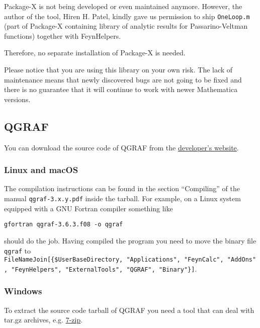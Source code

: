 \documentclass[../FeynHelpersManual.tex]{subfiles}
\begin{document}
Package-X is not being developed or even maintained anymore. However,
the author of the tool, Hiren H. Patel, kindly gave us permission to
ship \texttt{OneLoop.m} (part of Package-X containing library of
analytic results for Passarino-Veltman functions) together with
FeynHelpers.

Therefore, no separate installation of Package-X is needed.

Please notice that you are using this library on your own risk. The lack
of maintenance means that newly discovered bugs are not going to be
fixed and there is no guarantee that it will continue to work with newer
Mathematica versions.

\hypertarget{qgraf}{%
\subsection{QGRAF}\label{qgraf}}

You can download the source code of QGRAF from the
\href{http://cfif.ist.utl.pt/~paulo/qgraf.html}{developer's website}.

\hypertarget{linux-and-macos}{%
\subsubsection{Linux and macOS}\label{linux-and-macos}}

The compilation instructions can be found in the section ``Compiling''
of the manual \texttt{qgraf-3.x.y.pdf} inside the tarball. For example,
on a Linux system equipped with a GNU Fortran compiler something like

\begin{verbatim}
gfortran qgraf-3.6.3.f08 -o qgraf
\end{verbatim}

should do the job. Having compiled the program you need to move the
binary file \texttt{qgraf} to
\texttt{FileNameJoin[\allowbreak{}\{\allowbreak{}\$UserBaseDirectory,\ \allowbreak{}"Applications",\ \allowbreak{}"FeynCalc",\ \allowbreak{}"AddOns",\ \allowbreak{}"FeynHelpers",\ \allowbreak{}"ExternalTools",\ \allowbreak{}"QGRAF",\ \allowbreak{}"Binary"\}]}.

\hypertarget{windows-4}{%
\subsubsection{Windows}\label{windows-4}}

To extract the source code tarball of QGRAF you need a tool that can
deal with tar.gz archives, e.g. \href{https://www.7-zip.org/}{7-zip}.
\end{document}
